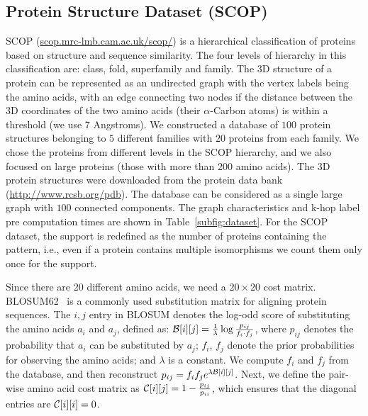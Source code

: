 


\subsection{Protein Structure Dataset (SCOP)} SCOP
(\url{scop.mrc-lmb.cam.ac.uk/scop/}) is a hierarchical classification of
proteins based on structure and sequence similarity. The four levels of
hierarchy in this classification are: class, fold, superfamily and
family.  The 3D structure of a protein can be represented as an
undirected graph with the vertex labels being the amino acids, with an
edge connecting two nodes if the distance between the 3D coordinates of
the two amino acids (their $\alpha$-Carbon atoms) is within a threshold
(we use 7 Angstroms).  We constructed a database of $100$ protein
structures belonging to $5$ different families with $20$ proteins from
each family.  We chose the proteins from different levels in the SCOP
hierarchy, and we also focused on large proteins (those with more than
200 amino acids).  The 3D protein structures were downloaded from the
protein data bank (\url{http://www.rcsb.org/pdb}).  The database can be
considered as a single large graph with $100$ connected components. The
graph characteristics and k-hop label pre computation times are shown in Table~\ref{subfig:dataset}.  For the
SCOP dataset, the support is redefined as the number of proteins
containing the pattern, i.e., even if a protein contains multiple
isomorphisms we count them only once for the support.

\smallskip{}
Since there are 20 different amino acids, we need a $20 \times 20$ cost
matrix. BLOSUM62~\cite{HH92} is a commonly used substitution matrix for aligning protein
sequences.  The $i,j$ entry in BLOSUM denotes the log-odd score
of substituting the amino acids $a_i$ and $a_j$, defined as:
${\mathcal{B}}[i][j] = \frac{1}{\lambda} 
	\log\frac{p_{ij}}{f_i \cdot f_j}$,
where $p_{ij}$ denotes the probability that  $a_i$ can be
substituted by $a_j$; 
$f_i$, $f_j$ denote the prior probabilities for observing the 
amino acids; and $\lambda$ is a constant. We compute $f_i$ and $f_j$
from the database, and then reconstruct $p_{ij}=f_if_j e^{\lambda
{\mathcal{B}}[i][j]}$. Next, we define the pair-wise amino acid cost matrix as
${\mathcal{C}}[i][j] = 1-\frac{p_{ij}}{p_{ii}}$, which ensures that
the diagonal entries are ${\mathcal{C}}[i][i] =0$.

